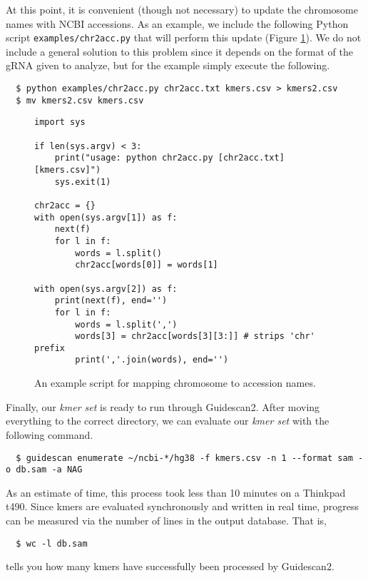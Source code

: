 \documentclass[11pt]{article}
\begin{document}
At this point, it is convenient (though not necessary) to update the
chromosome names with NCBI accessions. As an example, we include the
following Python script \texttt{examples/chr2acc.py} that will perform
this update (Figure \ref{fig:chr2accpy}). We do not include a general
solution to this problem since it depends on the format of the gRNA
given to analyze, but for the example simply execute the following.

\begin{verbatim}
  $ python examples/chr2acc.py chr2acc.txt kmers.csv > kmers2.csv
  $ mv kmers2.csv kmers.csv
\end{verbatim}

\begin{figure}[ht]
  \centering
  \begin{verbatim}
import sys

if len(sys.argv) < 3:
    print("usage: python chr2acc.py [chr2acc.txt] [kmers.csv]")
    sys.exit(1)

chr2acc = {}
with open(sys.argv[1]) as f:
    next(f)
    for l in f:
        words = l.split() 
        chr2acc[words[0]] = words[1]

with open(sys.argv[2]) as f:
    print(next(f), end='')
    for l in f:
        words = l.split(',')
        words[3] = chr2acc[words[3][3:]] # strips 'chr' prefix
        print(','.join(words), end='')
  \end{verbatim}
  \caption{\label{fig:chr2accpy} An example script for mapping
    chromosome to accession names.}
\end{figure}

Finally, our {\it kmer set} is ready to run through Guidescan2. After
moving everything to the correct directory, we can evaluate our {\it
  kmer set} with the following command.  \vspace{-0.8em}
\begin{verbatim}
  $ guidescan enumerate ~/ncbi-*/hg38 -f kmers.csv -n 1 --format sam -o db.sam -a NAG
\end{verbatim}
As an estimate of time, this process took less than 10 minutes on a
Thinkpad t490. Since kmers are evaluated synchronously and written in
real time, progress can be measured via the number of lines in the
output database. That is,
\vspace{-0.8em}
\begin{verbatim}
  $ wc -l db.sam
\end{verbatim}
tells you how many kmers have successfully been processed by Guidescan2.
\end{document}

